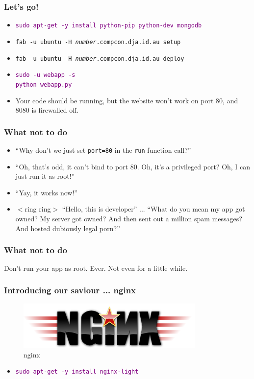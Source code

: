 \documentclass{beamer}
\newcommand\aws[1]{\textcolor{purple}{\texttt{#1}}}
\begin{document}
\begin{frame}
  \frametitle{Let's go!}
  \begin{itemize}

  \item \aws{sudo apt-get -y install python-pip python-dev mongodb}

  \item \texttt{fab -u ubuntu -H \textit{number}.compcon.dja.id.au
      setup}
  \item \texttt{fab -u ubuntu -H \textit{number}.compcon.dja.id.au deploy}

  \item \aws{sudo -u webapp -s}\\
    \aws{python webapp.py}
  
  \item Your code should be running, but the website won't work on
    port 80, and 8080 is firewalled off.

  \end{itemize}
\end{frame}

\begin{frame}
  \frametitle{What not to do}
  \begin{itemize}
  \item<1-> ``Why don't we just set \texttt{port=80} in the \texttt{run}
    function call?''
  \item<2-> ``Oh, that's odd, it can't bind to port 80. Oh, it's a
    privileged port? Oh, I can just run it as root!''
  \item<3-> ``Yay, it works now!''
  \item<4-> $<$ring ring$>$ ``Hello, this is developer'' ... ``What do
    you mean my app got owned? My server got owned? And then sent out
    a million spam messages? And hosted dubiously legal porn?''
  \end{itemize}
\end{frame}

\begin{frame}
  \frametitle{What not to do}
  {\Huge Don't run your app as root. Ever. Not even for a little
    while.}
\end{frame}

\begin{frame}
  \frametitle{Introducing our saviour ... nginx}
  \begin{figure}[h!]
    \centering
    \includegraphics[scale=0.5]{imgs/nginx_logo.png}
    \caption{nginx}
    \label{fig:nginx_logo}
  \end{figure}
  \begin{itemize}
  \item \aws{sudo apt-get -y install nginx-light}
  \end{itemize}
\end{frame}
\end{document}
